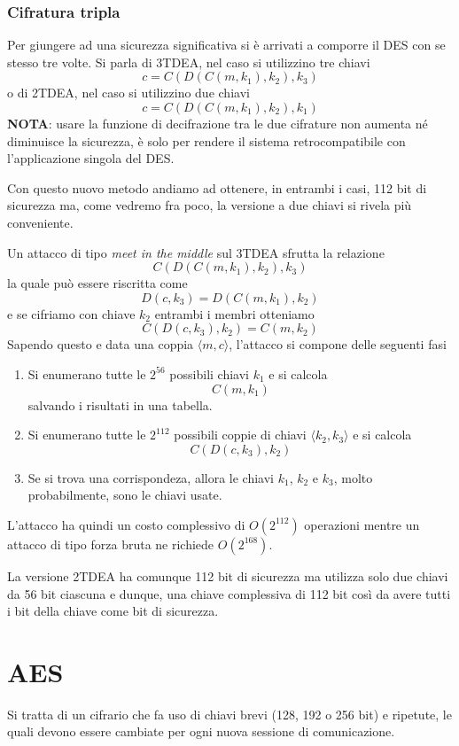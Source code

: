 \subsubsection{Cifratura tripla}
Per giungere ad una sicurezza significativa si \`e arrivati a comporre il DES con se stesso tre volte. Si parla di
3TDEA, nel caso si utilizzino tre chiavi
\[ c = C(D(C(m, k_1), k_2), k_3) \]
o di 2TDEA, nel caso si utilizzino due chiavi
\[ c = C(D(C(m, k_1), k_2), k_1) \]
\textbf{NOTA}: usare la funzione di decifrazione tra le due cifrature non aumenta n\'e diminuisce la sicurezza, \`e
solo per rendere il sistema retrocompatibile con l'applicazione singola del DES.

Con questo nuovo metodo andiamo ad ottenere, in entrambi i casi, 112 bit di sicurezza ma, come vedremo fra poco, la
versione a due chiavi si rivela pi\`u conveniente.

Un attacco di tipo \emph{meet in the middle} sul 3TDEA sfrutta la relazione
\[ C(D(C(m, k_1), k_2), k_3) \]
la quale pu\`o essere riscritta come
\[ D(c, k_3) = D(C(m, k_1), k_2) \]
e se cifriamo con chiave $k_2$ entrambi i membri otteniamo
\[ C(D(c, k_3), k_2) = C(m, k_2) \]
Sapendo questo e data una coppia $\langle m, c \rangle$, l'attacco si compone delle seguenti fasi
\begin{enumerate}
	\item Si enumerano tutte le $2^{56}$ possibili chiavi $k_1$ e si calcola
	      \[ C(m, k_1) \]
	      salvando i risultati in una tabella.
	\item Si enumerano tutte le $2^{112}$ possibili coppie di chiavi $\langle k_2, k_3 \rangle$ e si calcola
	      \[ C(D(c, k_3), k_2) \]
	\item Se si trova una corrispondeza, allora le chiavi $k_1$, $k_2$ e $k_3$, molto probabilmente, sono le chiavi
	      usate.
\end{enumerate}
L'attacco ha quindi un costo complessivo di $O(2^{112})$ operazioni mentre un attacco di tipo forza bruta ne richiede
$O(2^{168})$.

La versione 2TDEA ha comunque 112 bit di sicurezza ma utilizza solo due chiavi da 56 bit ciascuna e dunque, una chiave
complessiva di 112 bit cos\`i da avere tutti i bit della chiave come bit di sicurezza.

\section{AES}\label{AES}
Si tratta di un cifrario che fa uso di chiavi brevi (128, 192 o 256 bit) e ripetute, le quali devono essere cambiate
per ogni nuova sessione di comunicazione.

